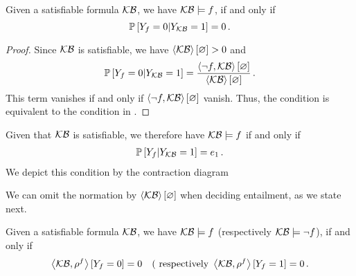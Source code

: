 % 
\begin{theorem}\label{the:probEntailment}
	Given a satisfiable formula $\mathcal{KB}$, we have $\mathcal{KB}\models f$, if and only if 
		\[ \mathbb{P}\left[Y_{f}=0|Y_{\mathcal{KB}}=1\right] = 0 \, .  \]
\end{theorem}
\begin{proof}
	Since $\mathcal{KB}$ is satisfiable, we have $\left\langle \mathcal{KB}\right\rangle \left[ \varnothing \right]>0$ and
		\[ \mathbb{P}\left[Y_{f}=0|Y_{\mathcal{KB}}=1\right] = \frac{\left\langle \lnot f, \mathcal{KB}\right\rangle \left[ \varnothing \right]}{\left\langle \mathcal{KB}\right\rangle \left[ \varnothing \right]} \, .  \]
	This term vanishes if and only if $\left\langle \lnot f, \mathcal{KB}\right\rangle \left[ \varnothing \right]$ vanish.
	Thus, the condition is equivalent to the condition in .
\end{proof}

Given that $\mathcal{KB}$ is satisfiable, we therefore have $\mathcal{KB}\models f$ if and only if
\begin{align}
	\condprobof{\formulavar}{\kbvar=1} = %
	\tbasis \, .  %
\end{align}
We depict this condition by the contraction diagram
\begin{center}
	
\end{center}


We can omit the normation by $\left\langle \mathcal{KB}\right\rangle \left[ \varnothing \right]$ when deciding entailment, as we state next.

\begin{corollary}\label{cor:parallelCriterion}
	Given a satisfiable formula $\mathcal{KB}$, we have $\mathcal{KB}\models f$ (respectively $\mathcal{KB}\models\lnot f$), if and only if 
		\[ \left\langle \mathcal{KB},\rho^{f}\right\rangle \left[ Y_{f}=0 \right] = 0 
		 \quad \text{( respectively }
		 \left\langle \mathcal{KB},\rho^{f}\right\rangle \left[ Y_{f}=1 \right] = 0 \, . \]
\end{corollary}






